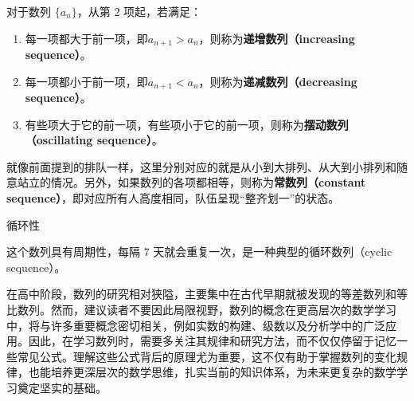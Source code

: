 对于数列 $\{a_n\}$，从第 $2$ 项起，若满足：
\begin{enumerate}
\item 每一项都大于前一项，即$a_{n+1} > a_n$，则称为\textbf{递增数列（increasing sequence）}。
\item 每一项都小于前一项，即$a_{n+1} < a_n$，则称为\textbf{递减数列（decreasing sequence）}。
\item 有些项大于它的前一项，有些项小于它的前一项，则称为\textbf{摆动数列（oscillating sequence）}。
\end{enumerate}
就像前面提到的排队一样，这里分别对应的就是从小到大排列、从大到小排列和随意站立的情况。另外，如果数列的各项都相等，则称为\textbf{常数列（constant sequence）}，即对应所有人高度相同，队伍呈现“整齐划一”的状态。



循环性


这个数列具有周期性，每隔 7 天就会重复一次，是一种典型的循环数列（cyclic sequence）。

在高中阶段，数列的研究相对狭隘，主要集中在古代早期就被发现的等差数列和等比数列。然而，建议读者不要因此局限视野，数列的概念在更高层次的数学学习中，将与许多重要概念密切相关，例如实数的构建、级数以及分析学中的广泛应用。因此，在学习数列时，需要多关注其规律和研究方法，而不仅仅停留于记忆一些常见公式。理解这些公式背后的原理尤为重要，这不仅有助于掌握数列的变化规律，也能培养更深层次的数学思维，扎实当前的知识体系，为未来更复杂的数学学习奠定坚实的基础。